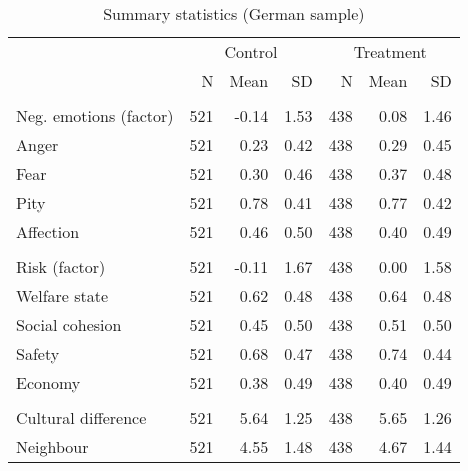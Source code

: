 \begin{table}[H]

\caption{Summary statistics (German sample) \label{tab_summary_allbus}}
\centering
\fontsize{10}{12}\selectfont
\begin{tabular}[t]{lrrrrrr}
\toprule
\multicolumn{1}{c}{ } & \multicolumn{3}{c}{Control} & \multicolumn{3}{c}{Treatment} \\
\cmidrule(l{3pt}r{3pt}){2-4} \cmidrule(l{3pt}r{3pt}){5-7}
  & N & Mean & SD & N & Mean & SD\\
\midrule
\addlinespace[0.3em]
\multicolumn{7}{l}{\textbf{Emotions}}\\
\hspace{1em}Neg. emotions (factor) & 521 & -0.14 & 1.53 & 438 & 0.08 & 1.46\\
\hspace{1em}Anger & 521 & 0.23 & 0.42 & 438 & 0.29 & 0.45\\
\hspace{1em}Fear & 521 & 0.30 & 0.46 & 438 & 0.37 & 0.48\\
\hspace{1em}Pity & 521 & 0.78 & 0.41 & 438 & 0.77 & 0.42\\
\hspace{1em}Affection & 521 & 0.46 & 0.50 & 438 & 0.40 & 0.49\\
\addlinespace[0.3em]
\multicolumn{7}{l}{\textbf{Risk}}\\
\hspace{1em}Risk (factor) & 521 & -0.11 & 1.67 & 438 & 0.00 & 1.58\\
\hspace{1em}Welfare state & 521 & 0.62 & 0.48 & 438 & 0.64 & 0.48\\
\hspace{1em}Social cohesion & 521 & 0.45 & 0.50 & 438 & 0.51 & 0.50\\
\hspace{1em}Safety & 521 & 0.68 & 0.47 & 438 & 0.74 & 0.44\\
\hspace{1em}Economy & 521 & 0.38 & 0.49 & 438 & 0.40 & 0.49\\
\addlinespace[0.3em]
\multicolumn{7}{l}{\textbf{Social distance}}\\
\hspace{1em}Cultural difference & 521 & 5.64 & 1.25 & 438 & 5.65 & 1.26\\
\hspace{1em}Neighbour & 521 & 4.55 & 1.48 & 438 & 4.67 & 1.44\\

\end{tabular}
\end{table}
